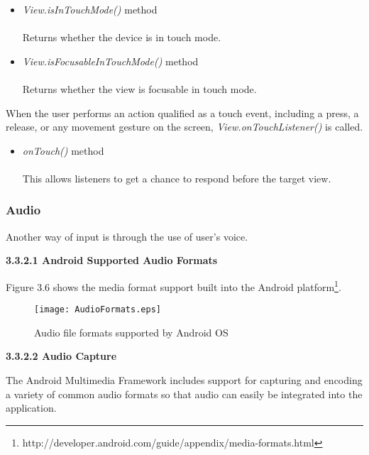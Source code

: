 \begin{itemize}
\item \textit{View.isInTouchMode()} method
\\\\  Returns whether the device is in touch mode.
\item \textit{View.isFocusableInTouchMode()} method
\\\\Returns whether the view is focusable in touch mode.
\end{itemize}

When the user performs an action qualified as a touch event, including a press, a release, or any movement gesture on the screen, \textit{View.onTouchListener()} is called.

\begin{itemize}
\item \textit{onTouch()} method
\\\\This allows listeners to get a chance to respond before the target view.
\end{itemize}

\subsubsection{Audio}

Another way of input is through the use of user's voice.

\begin{flushleft}
\textbf{3.3.2.1	Android Supported Audio Formats}
\end{flushleft}

\begin{raggedright}
Figure 3.6 shows the media format support built into the Android platform\footnote[2]{http://developer.android.com/guide/appendix/media-formats.html}.
\end{raggedright}

\pagebreak

\begin{figure}[htbp!]   
   \centering           
   \texttt{[image: AudioFormats.eps]} 
   \caption{Audio file formats supported by Android OS}
   \label{fig:audiofileformats}
\end{figure}

\begin{flushleft}
\textbf{3.3.2.2 Audio Capture}
\end{flushleft}

\begin{raggedright}
The Android Multimedia Framework includes support for capturing and encoding a variety of common audio formats so that audio can easily be integrated into the application.
\end{raggedright}

